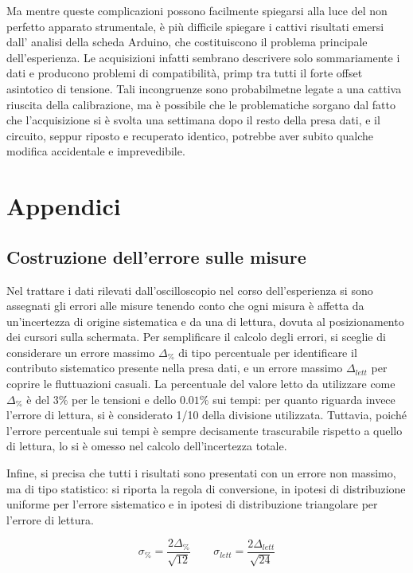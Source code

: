 \documentclass{article}
\begin{document}
Ma mentre queste complicazioni possono facilmente spiegarsi alla luce del non perfetto apparato strumentale, è più difficile spiegare i cattivi risultati emersi dall'
analisi della scheda Arduino, che costituiscono il problema principale dell'esperienza. 
Le acquisizioni infatti sembrano descrivere solo sommariamente i dati e producono problemi di compatibilità, primp tra tutti il forte offset asintotico di tensione. 
Tali incongruenze sono probabilmetne legate a una cattiva riuscita della calibrazione, ma è possibile che le problematiche sorgano dal fatto che l'acquisizione si è 
svolta una settimana dopo il resto della presa dati, e il circuito, seppur riposto e recuperato identico, potrebbe aver subito qualche modifica accidentale e 
imprevedibile.



\newpage
\appendix
\section{Appendici}
\label{appendice}
\subsection{Costruzione dell'errore sulle misure}
\label{Calcerr}

Nel trattare i dati rilevati dall'oscilloscopio nel corso dell'esperienza si sono assegnati gli errori alle misure tenendo conto che ogni misura è affetta da un'incertezza di origine sistematica e da una di lettura, dovuta al posizionamento dei cursori sulla schermata. Per semplificare il calcolo degli errori, si sceglie di considerare un errore massimo $\Delta_{\%}$ di tipo percentuale per identificare il contributo sistematico presente nella presa dati, e un errore massimo $\Delta_{lett}$ per coprire le fluttuazioni casuali. La percentuale del valore letto da utilizzare come $\Delta_{\%}$ è del $3\%$ per le tensioni e dello $0.01\%$ sui tempi: per quanto riguarda invece l'errore di lettura, si è considerato 1/10 della divisione utilizzata.
Tuttavia, poiché l'errore percentuale sui tempi è sempre decisamente trascurabile rispetto a quello di lettura, lo si è omesso nel calcolo dell'incertezza totale.

Infine, si precisa che tutti i risultati sono presentati con un errore non massimo, ma di tipo statistico: si riporta la regola di conversione, in ipotesi di distribuzione uniforme per l'errore sistematico e in ipotesi di distribuzione triangolare per l'errore di lettura.

\begin{equation}
\sigma_{\%}=\frac{2\Delta_{\%}}{\sqrt{12}} \quad \quad \sigma_{lett}=\frac{2\Delta_{lett}}{\sqrt{24}}
\end{equation}
\end{document}
